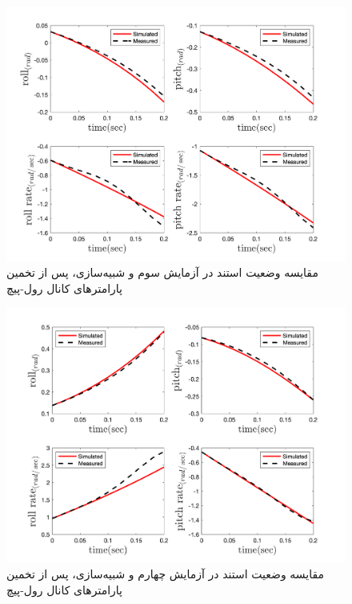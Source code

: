 \begin{figure}[H]
	\includegraphics[width=12cm]{../../Figures/RCP/roll_pitch_parameter_estimation/RCP_roll_pitch_S3.png}
	\centering
	\caption{مقايسه وضعیت استند در  آزمايش سوم و شبیه‌سازی، پس از تخمین پارامترهای کانال رول-پیچ}
	\label{roll_pitch_ps3}
\end{figure}
\begin{figure}[H]
	\includegraphics[width=12cm]{../../Figures/RCP/roll_pitch_parameter_estimation/RCP_roll_pitch_S4.png}
	\centering
	\caption{مقايسه وضعیت استند در  آزمايش چهارم و شبیه‌سازی، پس از تخمین پارامترهای کانال رول-پیچ}
	\label{roll_pitch_ps4}
\end{figure}
